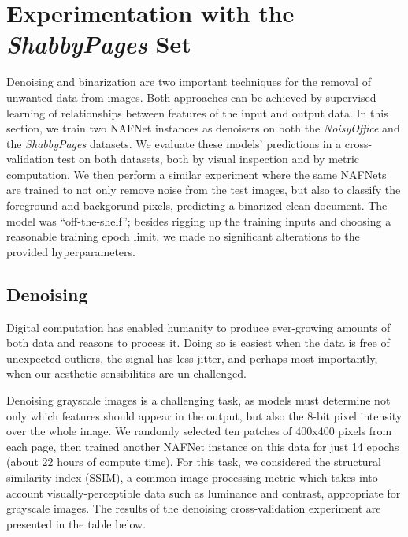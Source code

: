 \documentclass[runningheads]{llncs}
\begin{document}
\section{Experimentation with the \emph{ShabbyPages} Set}
Denoising and binarization are two important techniques for the removal of unwanted data from images.
Both approaches can be achieved by supervised learning of relationships between features of the input and output data.
In this section, we train two NAFNet \cite{ref_nafnet} instances as denoisers on both the \emph{NoisyOffice} and the \emph{ShabbyPages} datasets. We evaluate these models' predictions in a cross-validation test on both datasets, both by visual inspection and by metric computation.
We then perform a similar experiment where the same NAFNets are trained to not only remove noise from the test images, but also to classify the foreground and backgorund pixels, predicting a binarized clean document.
The model was ``off-the-shelf''; besides rigging up the training inputs and choosing a reasonable training epoch limit, we made no significant alterations to the provided hyperparameters.

\subsection{Denoising}
Digital computation has enabled humanity to produce ever-growing amounts of both data and reasons to process it.
Doing so is easiest when the data is free of unexpected outliers, the signal has less jitter, and perhaps most importantly, when our aesthetic sensibilities are un-challenged.

Denoising grayscale images is a challenging task, as models must determine not only which features should appear in the output, but also the 8-bit pixel intensity over the whole image.
We randomly selected ten patches of 400x400 pixels from each page, then trained another NAFNet instance on this data for just 14 epochs (about 22 hours of compute time).
For this task, we considered the structural similarity index (SSIM), a common image processing metric which takes into account visually-perceptible data such as luminance and contrast, appropriate for grayscale images.
The results of the denoising cross-validation experiment are presented in the table below.

\begin{table}[]
    \centering
    \caption{Document image denoising cross-test performance of NAFNet models trained on \emph{ShabbyPages} and \emph{NoisyOffice}.}
    \label{tab:denoising_results}
\end{table}
\end{document}
